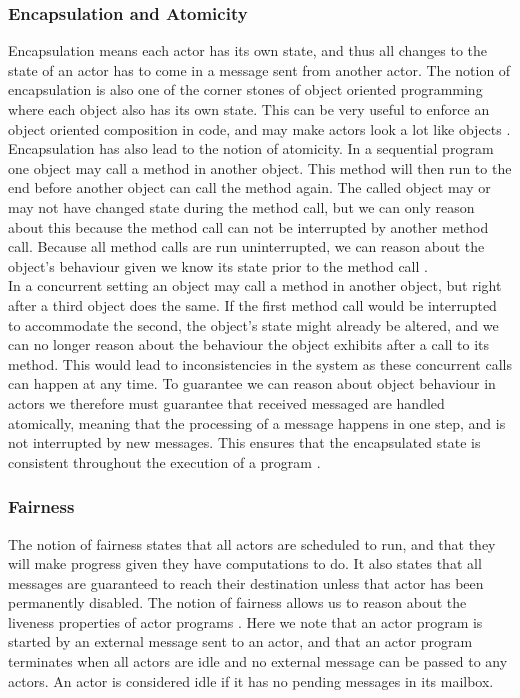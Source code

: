 \subsubsection{Encapsulation and Atomicity}
Encapsulation means each actor has its own state, and thus all changes to the state of an actor has to come in a message sent from another actor. The notion of encapsulation is also one of the corner stones of object oriented programming where each object also has its own state. This can be very useful to enforce an object oriented composition in code, and may make actors look a lot like objects \cite{ActorModelPaper}.\\
Encapsulation has also lead to the notion of atomicity. In a sequential program one object may call a method in another object. This method will then run to the end before another object can call the method again. The called object may or may not have changed state during the method call, but we can only reason about this because the method call can not be interrupted by another method call. Because all method calls are run uninterrupted, we can reason about the object's behaviour given we know its state prior to the method call \cite{ActorModelPaper}.\\
In a concurrent setting an object may call a method in another object, but right after a third object does the same. If the first method call would be interrupted to accommodate the second, the object's state might already be altered, and we can no longer reason about the behaviour the object exhibits after a call to its method. This would lead to inconsistencies in the system as these concurrent calls can happen at any time. To guarantee we can reason about object behaviour in actors we therefore must guarantee that received messaged are handled atomically, meaning that the processing of a message happens in one step, and is not interrupted by new messages. This ensures that the encapsulated state is consistent throughout the execution of a program \cite{ActorModelPaper}.

\subsubsection{Fairness}
The notion of fairness states that all actors are scheduled to run, and that they will make progress given they have computations to do. It also states that all messages are guaranteed to reach their destination unless that actor has been permanently disabled. The notion of fairness allows us to reason about the liveness properties of actor programs \cite{ActorModelPaper}. Here we note that an actor program is started by an external message sent to an actor, and that an actor program terminates when all actors are idle and no external message can be passed to any actors. An actor is considered idle if it has no pending messages in its mailbox.

